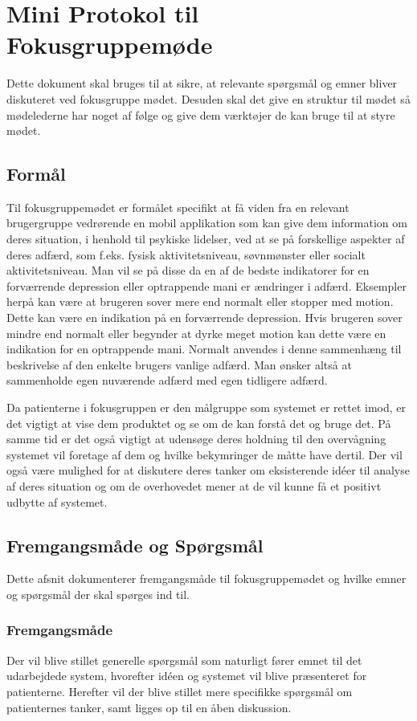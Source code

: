 \chapter*{Mini Protokol til Fokusgruppemøde}
Dette dokument skal bruges til at sikre, at relevante spørgsmål og emner bliver diskuteret ved fokusgruppe mødet.
Desuden skal det give en struktur til mødet så mødelederne har noget af følge og give dem værktøjer de kan bruge til at styre mødet.

\section*{Formål}
Til fokusgruppemødet er formålet specifikt at få viden fra en relevant brugergruppe vedrørende en mobil applikation som kan give dem information om deres situation, i henhold til psykiske lidelser, ved at se på forskellige aspekter af deres adfærd, som f.eks. fysisk aktivitetsniveau, søvnmønster eller socialt aktivitetsniveau. 
Man vil se på disse da en af de bedste indikatorer for en forværrende depression eller optrappende mani er ændringer i adfærd.
Eksempler herpå kan være at brugeren sover mere end normalt eller stopper med motion.
Dette kan være en indikation på en forværrende depression.
Hvis brugeren sover mindre end normalt eller begynder at dyrke meget motion kan dette være en indikation for en optrappende mani.
Normalt anvendes i denne sammenhæng til beskrivelse af den enkelte brugers vanlige adfærd.
Man ønsker altså at sammenholde egen nuværende adfærd med egen tidligere adfærd.
 
Da patienterne i fokusgruppen er den målgruppe som systemet er rettet imod, er det vigtigt at vise dem produktet og se om de kan forstå det og bruge det.
På samme tid er det også vigtigt at udensøge deres holdning til den overvågning systemet vil foretage af dem og hvilke bekymringer de måtte have dertil.
Der vil også være mulighed for at diskutere deres tanker om eksisterende idéer til analyse af deres situation og om de overhovedet mener at de vil kunne få et positivt udbytte af systemet.

\section*{Fremgangsmåde og Spørgsmål}
Dette afsnit dokumenterer fremgangsmåde til fokusgruppemødet og hvilke emner og spørgsmål der skal spørges ind til.

\subsection*{Fremgangsmåde}
Der vil blive stillet generelle spørgsmål som naturligt fører emnet til det udarbejdede system, hvorefter idéen og systemet vil blive præsenteret for patienterne. 
Herefter vil der blive stillet mere specifikke spørgsmål om patienternes tanker, samt ligges op til en åben diskussion.

